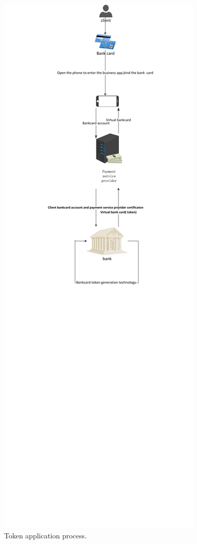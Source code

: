 \documentclass[journal]{IEEEtran}
\begin{document}
\begin{figure}[htbp]
\centerline{\includegraphics[scale=0.7]{token_shengcheng2.pdf}}
\caption{Token application process.}
\label{fig}
\end{figure}
\end{document}
